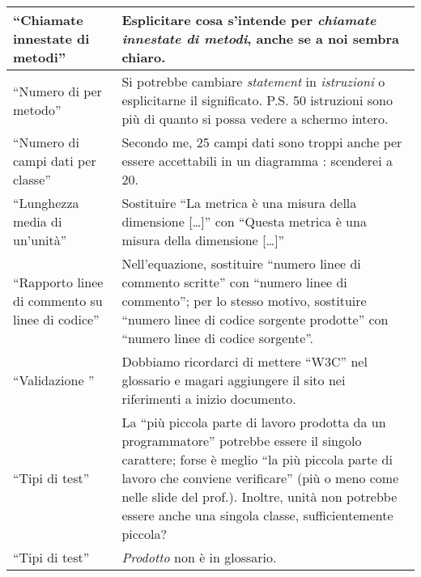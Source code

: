 \documentclass[a4paper]{article}
\begin{document}
\begin{longtable}{| p{3cm} | p{10cm} |}
	“Chiamate innestate di metodi” & Esplicitare cosa s'intende per \emph{chiamate innestate di metodi}, anche se a noi sembra chiaro. \\ \hline
	“Numero di \gloss{statement} per metodo” & Si potrebbe cambiare \emph{statement} in \emph{istruzioni} o esplicitarne il significato. P.S. 50 istruzioni sono più di quanto si possa vedere a schermo intero. \\ \hline
	“Numero di campi dati per classe” & Secondo me, 25 campi dati sono troppi anche per essere accettabili in un diagramma \gloss{UML}: scenderei a 20. \\ \hline
	“Lunghezza media di un'unità” & Sostituire “La metrica è una misura della dimensione [\dots]” con “Questa metrica è una misura della dimensione [\dots]” \\ \hline
	“Rapporto linee di commento su linee di codice” & Nell'equazione, sostituire “numero linee di commento scritte” con “numero linee di commento”; per lo stesso motivo, sostituire “numero linee di codice sorgente prodotte” con “numero linee di codice sorgente”. \\ \hline
	“Validazione \gloss{W3C}” & Dobbiamo ricordarci di mettere “W3C” nel glossario e magari aggiungere il sito nei riferimenti a inizio documento. \\ \hline
	“Tipi di test” & La “più piccola parte di lavoro prodotta da un programmatore” potrebbe essere il singolo carattere; forse è meglio “la più piccola parte di lavoro che conviene verificare” (più o meno come nelle slide del prof.). Inoltre, unità non potrebbe essere anche una singola classe, sufficientemente piccola? \\ \hline
	“Tipi di test” & \emph{Prodotto} non è in glossario. \\ \hline
\end{longtable}
\end{document}
